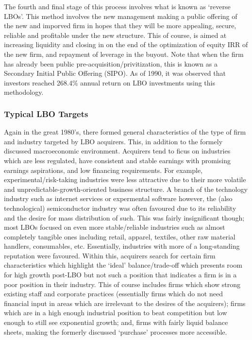 \documentclass[11pt, english]{article}
\begin{document}
	The fourth and final stage of this process involves what is known as `reverse LBOs'. This method involves the new management making a public offering of the new and imporved firm in hopes that they will be more appealing, secure, reliable and profitable under the new structure. This of course, is aimed at increasing liquidity and closing in on the end of the optimization of equity IRR of the new firm, and repayment of leverage in the buyout. Note that when the firm has already been public pre-acquisition/privitization, this is known as a Secondary Initial Public Offering (SIPO). As of 1990, it was observed that investors reached 268.4\% annual return on LBO investments using this methodology.

		\subsubsection*{Typical LBO Targets}
	
	Again in the great 1980's, there formed general characteristics of the type of firm and industry targeted by LBO acquirers. This, in addition to the formely discussed macroeconomic environment. Acquirers tend to ficus on industries which are less regulated, have consistent and stable earnings with promising earnings aspirations, and low financing requirements. For example, experimental/risk-taking industries were less attractive due to their more volatile and unpredictable-growth-oriented business structure. A branch of the technology industry such as internet services or expermental software however, the (also technological) semiconductor industry was often favoured due to its reliability and the desire for mass distribution of such. This was fairly insignificant though; most LBOs focused on even more stable/reliable industries such as almost completely tangible ones including retail, apparel, textiles, other raw material handlers, consumables, etc. Essentially, industries with more of a long-standing reputation were favoured. Within this, acquirers search for certain firm characteristics which highlight the `ideal' balance/trade-off which presents room for high growth post-LBO but not such a position that indicates a firm is in a poor position in their industry. This of course includes firms which show strong existing staff and corporate practices (essentially firms which do not need financial input in areas which are irrelevant to the desires of the acquirers); firms which are in a high enough industrial position to beat competition but low enough to still see exponential growth; and, firms with fairly liquid balance sheets, making the formerly discussed `purchase' processes more accessible.
\end{document}
